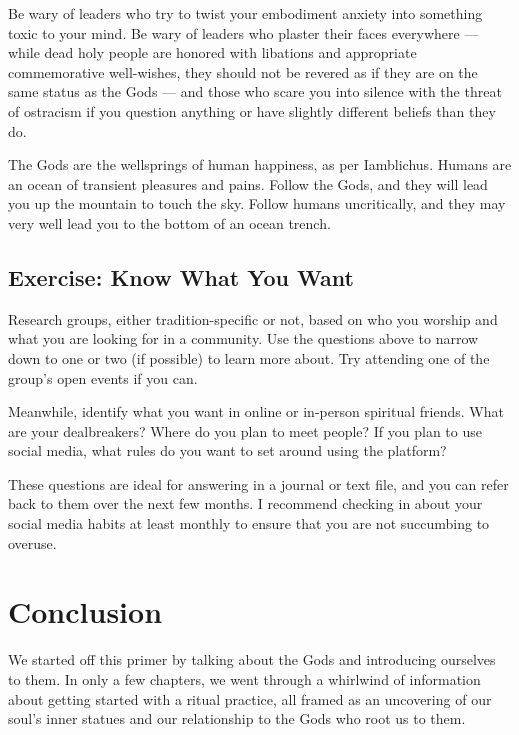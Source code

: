 \documentclass[
]{book}
\begin{document}
Be wary of leaders who try to twist your embodiment anxiety into something toxic to your mind. Be wary of leaders who plaster their faces everywhere --- while dead holy people are honored with libations and appropriate commemorative well-wishes, they should not be revered as if they are on the same status as the Gods --- and those who scare you into silence with the threat of ostracism if you question anything or have slightly different beliefs than they do.

The Gods are the wellsprings of human happiness, as per Iamblichus. Humans are an ocean of transient pleasures and pains. Follow the Gods, and they will lead you up the mountain to touch the sky. Follow humans uncritically, and they may very well lead you to the bottom of an ocean trench.

\hypertarget{exercise-know-what-you-want}{%
\section{Exercise: Know What You Want}\label{exercise-know-what-you-want}}

Research groups, either tradition-specific or not, based on who you worship and what you are looking for in a community. Use the questions above to narrow down to one or two (if possible) to learn more about. Try attending one of the group's open events if you can.

Meanwhile, identify what you want in online or in-person spiritual friends. What are your dealbreakers? Where do you plan to meet people? If you plan to use social media, what rules do you want to set around using the platform?

These questions are ideal for answering in a journal or text file, and you can refer back to them over the next few months. I recommend checking in about your social media habits at least monthly to ensure that you are not succumbing to overuse.

\hypertarget{conclusion}{%
\chapter{Conclusion}\label{conclusion}}

We started off this primer by talking about the Gods and introducing ourselves to them. In only a few chapters, we went through a whirlwind of information about getting started with a ritual practice, all framed as an uncovering of our soul's inner statues and our relationship to the Gods who root us to them.
\end{document}
